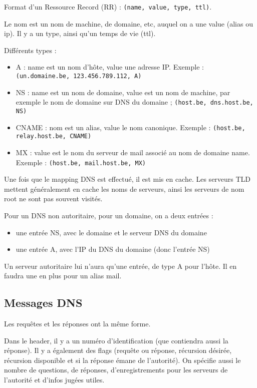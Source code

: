 	Format d'un Ressource Record (RR) : \texttt{(name, value, type, ttl)}.
	
	Le nom est un nom de machine, de domaine, etc, auquel on a une value (alias ou ip). Il y a un type, ainsi qu'un temps de vie (ttl).
	
	Différents types :
	
	\begin{itemize}
		\item A : name est un nom d'hôte, value une adresse IP. Exemple : \texttt{(un.domaine.be, 123.456.789.112, A)}
		\item NS : name est un nom de domaine, value est un nom de machine, par exemple le nom de domaine sur DNS du domaine ; \texttt{(host.be, dns.host.be, NS)}
		\item CNAME : nom est un alias, value le nom canonique. Exemple : \texttt{(host.be, relay.host.be, CNAME)}
		\item MX : value est le nom du serveur de mail associé au nom de domaine name. Exemple : \texttt{(host.be, mail.host.be, MX)}
	\end{itemize}
	
	Une fois que le mapping DNS est effectué, il est mis en cache. Les serveurs TLD mettent généralement en cache les noms de serveurs, ainsi les serveurs de nom root ne sont pas souvent visités.
	
	Pour un DNS non autoritaire, pour un domaine, on a deux entrées :
	
	
	\begin{itemize}
		\item une entrée NS, avec le domaine et le serveur DNS du domaine
		\item une entrée A, avec l'IP du DNS du domaine (donc l'entrée NS)
	\end{itemize}

	Un serveur autoritaire lui n'aura qu'une entrée, de type A pour l'hôte. Il en faudra une en plus pour un alias mail.

	
	\subsection{Messages DNS}
	
	Les requêtes et les réponses ont la même forme. 
	
	Dans le header, il y a un numéro d'identification (que contiendra aussi la réponse). Il y a également des flags (requête ou réponse, récursion désirée, récursion disponible et si la réponse émane de l'autorité). On spécifie aussi le nombre de questions, de réponses, d'enregistrements pour les serveurs de l'autorité et d'infos jugées utiles.
	
